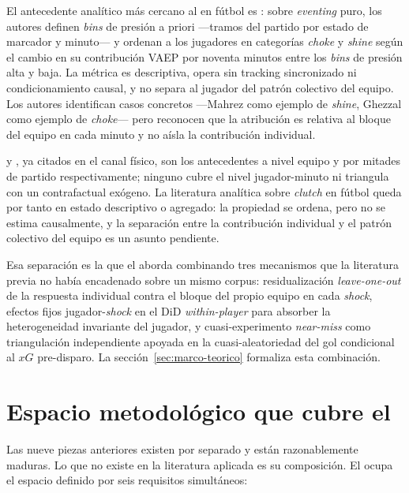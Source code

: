 El antecedente analítico más cercano al \CCV en fútbol es
\textcite{Bransen2019Choke}: sobre \textit{eventing} puro, los autores
definen \textit{bins} de presión a priori ---tramos del partido por
estado de marcador y minuto--- y ordenan a los jugadores en categorías
\emph{choke} y \emph{shine} según el cambio en su contribución VAEP
por noventa minutos entre los \textit{bins} de presión alta y baja.
La métrica es descriptiva, opera sin tracking sincronizado ni
condicionamiento causal, y no separa al jugador del patrón colectivo
del equipo. Los autores identifican casos concretos
---Mahrez como ejemplo de \textit{shine}, Ghezzal como ejemplo de
\textit{choke}--- pero reconocen que la atribución es relativa al
bloque del equipo en cada minuto y no aísla la contribución individual.

\textcite{Konefal2024} y \textcite{Morgans2025}, ya citados en el
canal físico, son los antecedentes a nivel equipo y por mitades de
partido respectivamente; ninguno cubre el nivel jugador-minuto ni
triangula con un contrafactual exógeno. La literatura analítica sobre
\textit{clutch} en fútbol queda por tanto en estado descriptivo o
agregado: la propiedad se ordena, pero no se estima causalmente, y la
separación entre la contribución individual y el patrón colectivo del
equipo es un asunto pendiente.

Esa separación es la que el \CCV aborda combinando tres mecanismos
que la literatura previa no había encadenado sobre un mismo corpus:
residualización \textit{leave-one-out} de la respuesta individual
contra el bloque del propio equipo en cada \textit{shock}, efectos
fijos jugador-\textit{shock} en el DiD \textit{within-player} para
absorber la heterogeneidad invariante del jugador, y cuasi-experimento
\textit{near-miss} como triangulación independiente apoyada en la
cuasi-aleatoriedad del gol condicional al $xG$ pre-disparo. La sección~\ref{sec:marco-teorico} formaliza esta
combinación.


\section{Espacio metodológico que cubre el \CCV}
\label{sec:sota-gap}

Las nueve piezas anteriores existen por separado y están razonablemente
maduras. Lo que no existe en la literatura aplicada es su composición.
El \CCV ocupa el espacio definido por seis requisitos simultáneos:

